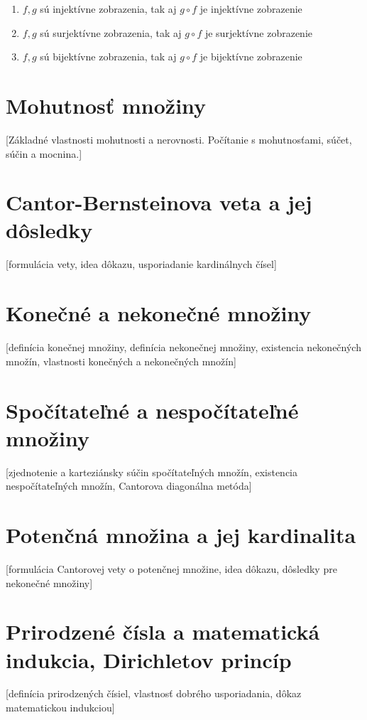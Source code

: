 		\begin{enumerate}
		\item $f , g$ sú injektívne zobrazenia, tak aj $g \circ f$ je injektívne zobrazenie
		\item $f , g$ sú surjektívne zobrazenia, tak aj $g \circ f$ je surjektívne zobrazenie
		\item $f , g$ sú bijektívne zobrazenia, tak aj $g \circ f$ je bijektívne zobrazenie
		\end{enumerate}


\section {Mohutnosť množiny}

  [Základné vlastnosti mohutnosti a nerovnosti. Počítanie s mohutnosťami, súčet, súčin a mocnina.] 

\section {Cantor-Bernsteinova veta a jej dôsledky}
  [formulácia vety, idea dôkazu, usporiadanie kardinálnych čísel] 

\section {Konečné a nekonečné množiny}
  [definícia konečnej množiny, definícia nekonečnej množiny, existencia nekonečných množín, vlastnosti konečných a nekonečných množín]

\section {Spočítateľné a nespočítateľné množiny}
  [zjednotenie a karteziánsky súčin spočítateľných množín, existencia nespočítateľných množín, Cantorova diagonálna metóda]

\section {Potenčná množina a jej kardinalita}
  [formulácia Cantorovej vety o potenčnej množine, idea dôkazu, dôsledky pre nekonečné množiny] 

\section {Prirodzené čísla a matematická indukcia, Dirichletov princíp}
  [definícia prirodzených čísiel, vlastnosť dobrého usporiadania, dôkaz matematickou indukciou]

